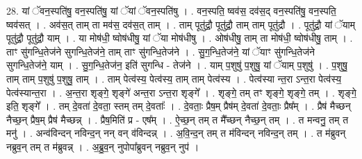 \documentclass[17pt]{extarticle}
\begin{document}
28. यां ॅवन॒स्पति॑षु॒ वन॒स्पति॑षु॒ यां ॅयां ॅवन॒स्पति॑षु । . वन॒स्पति॒ ष्वव॑स॒ दव॑स॒द् वन॒स्पति॑षु॒ वन॒स्पति॒ ष्वव॑सत् । . अव॑स॒त् ताम् ता मव॑स॒ दव॑स॒त् ताम् । . ताम् पूतु॑द्रौ॒ पूतु॑द्रौ॒ ताम् ताम् पूतु॑द्रौ । . पूतु॑द्रौ॒ यां ॅयाम् पूतु॑द्रौ॒ पूतु॑द्रौ॒ याम् । . या मोष॑धी॒ ष्वोष॑धीषु॒ यां ॅया मोष॑धीषु । . ओष॑धीषु॒ ताम् ता मोष॑धी॒ ष्वोष॑धीषु॒ ताम् । . ताꣳ सु॑गन्धि॒तेज॑ने सुगन्धि॒तेज॑ने॒ ताम् ताꣳ सु॑गन्धि॒तेज॑ने । . सु॒ग॒न्धि॒तेज॑ने॒ यां ॅयाꣳ सु॑गन्धि॒तेज॑ने सुगन्धि॒तेज॑ने॒ याम् । . सु॒ग॒न्धि॒तेज॑न॒ इति॑ सुगन्धि - तेज॑ने । . याम् प॒शुषु॑ प॒शुषु॒ यां ॅयाम् प॒शुषु॑ । . प॒शुषु॒ ताम् ताम् प॒शुषु॑ प॒शुषु॒ ताम् । . ताम् पेत्व॑स्य॒ पेत्व॑स्य॒ ताम् ताम् पेत्व॑स्य । . पेत्व॑स्या न्त॒रा ऽन्त॒रा पेत्व॑स्य॒ पेत्व॑स्यान्त॒रा । . अ॒न्त॒रा शृङ्गे॒ शृङ्गे॑ अन्त॒रा ऽन्त॒रा शृङ्गे᳚ । . शृङ्गे॒ तम् तꣳ शृङ्गे॒ शृङ्गे॒ तम् । . शृङ्गे॒ इति॒ शृङ्गे᳚ । . तम् दे॒वता॑ दे॒वता॒ स्तम् तम् दे॒वताः᳚ । . दे॒वताः॒ प्रैष॒म् प्रैष॑म् दे॒वता॑ दे॒वताः॒ प्रैष᳚म् । . प्रैष॑ मैच्छन् नैच्छ॒न् प्रैष॒म् प्रैष॑ मैच्छन्न् । . प्रैष॒मिति॑ प्र - एष᳚म् । . ऐ॒च्छ॒न् तम् त मै᳚च्छन् नैच्छ॒न् तम् । . त मन्वनु॒ तम् त मनु॑ । . अन्व॑विन्दन् नविन्द॒न् नन् वन् व॑विन्दन्न् । . अ॒वि॒न्द॒न् तम् त म॑विन्दन् नविन्द॒न् तम् । . त म॑ब्रुवन् नब्रुव॒न् तम् त म॑ब्रुवन्न् । . अ॒ब्रु॒व॒न् नुपोपा᳚ब्रुवन् नब्रुव॒न् नुप॑ । \newline
\end{document}
